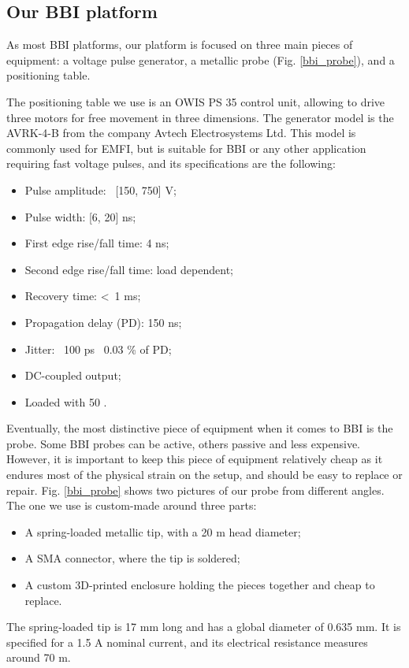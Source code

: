 	\subsection{Our BBI platform}
		As most BBI platforms, our platform is focused on three main pieces of equipment: a voltage pulse generator, a metallic probe (Fig. \ref{bbi_probe}), and a positioning table.
		
		The positioning table we use is an OWIS PS 35 control unit, allowing to drive three motors for free movement in three dimensions.
		The generator model is the AVRK-4-B from the company Avtech Electrosystems Ltd.
		This model is commonly used for EMFI, but is suitable for BBI or any other application requiring fast voltage pulses, and its specifications are the following:
		\begin{itemize}
			\item Pulse amplitude: \textpm\ [150, 750] V;
			\item Pulse width: [6, 20] ns;
			\item First edge rise/fall time: 4 ns;
			\item Second edge rise/fall time: load dependent;
			\item Recovery time: \textless\ 1 ms;
			\item Propagation delay (PD): 150 ns;
			\item Jitter: \textpm\ 100 ps \textpm\ 0.03 \% of PD;
			\item DC-coupled output;
			\item Loaded with 50 \textOmega.
		\end{itemize}
		
		Eventually, the most distinctive piece of equipment when it comes to BBI is the probe.
		Some BBI probes can be active, others passive and less expensive.
		However, it is important to keep this piece of equipment relatively cheap as it endures most of the physical strain on the setup, and should be easy to replace or repair.
		Fig. \ref{bbi_probe} shows two pictures of our probe from different angles.
		The one we use is custom-made around three parts:
		\begin{itemize}
			\item A spring-loaded metallic tip, with a 20 \textmu m head diameter;
			\item A SMA connector, where the tip is soldered;
			\item A custom 3D-printed enclosure holding the pieces together and cheap to replace.
		\end{itemize}
		The spring-loaded tip is 17 mm long and has a global diameter of 0.635 mm.
		It is specified for a 1.5 A nominal current, and its electrical resistance measures around 70 m\textOmega.


